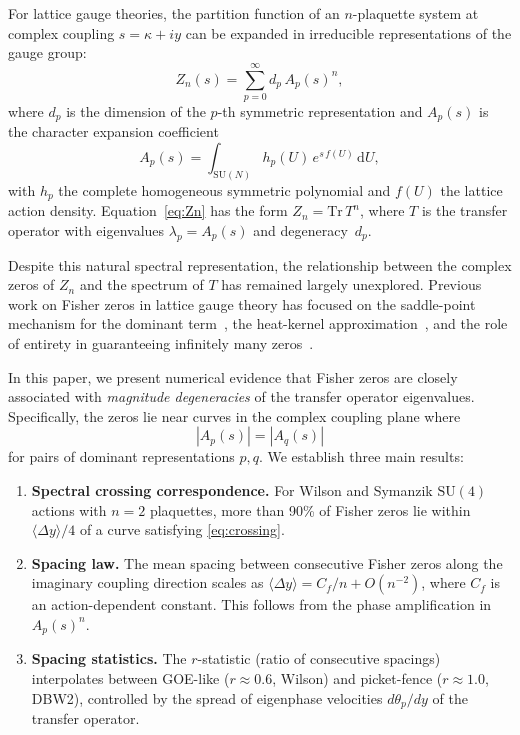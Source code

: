 \documentclass[12pt]{article}
\theoremstyle{definition}
\theoremstyle{remark}
\newcommand{\SU}{\mathrm{SU}}
\newcommand{\Tr}{\mathrm{Tr}}
\newcommand{\dU}{\,\mathrm{d}U}
\newcommand{\avg}[1]{\langle #1 \rangle}
\begin{document}
For lattice gauge theories, the partition function of an $n$-plaquette
system at complex coupling $s = \kappa + iy$ can be expanded in
irreducible representations of the gauge group:
\begin{equation}\label{eq:Zn}
Z_n(s) = \sum_{p=0}^{\infty} d_p\, A_p(s)^n,
\end{equation}
where $d_p$ is the dimension of the $p$-th symmetric representation
and $A_p(s)$ is the character expansion coefficient
\begin{equation}\label{eq:Ap}
A_p(s) = \int_{\SU(N)} h_p(U)\, e^{s\, f(U)}\dU,
\end{equation}
with $h_p$ the complete homogeneous symmetric polynomial and $f(U)$
the lattice action density.  Equation~\eqref{eq:Zn} has the
form $Z_n = \Tr\, T^n$, where $T$ is the transfer operator with
eigenvalues $\lambda_p = A_p(s)$ and degeneracy~$d_p$.

Despite this natural spectral representation, the relationship between
the complex zeros of $Z_n$ and the spectrum of $T$ has remained
largely unexplored.  Previous work on Fisher zeros in lattice gauge
theory has focused on the saddle-point mechanism for the dominant
term~\cite{OlbrykRho,OlbrykChi}, the heat-kernel
approximation~\cite{HeatKernel}, and the role of entirety in
guaranteeing infinitely many zeros~\cite{OlbrykChi}.

In this paper, we present numerical evidence that Fisher zeros are
closely associated with \emph{magnitude degeneracies} of the transfer
operator eigenvalues.  Specifically, the zeros lie near curves in the
complex coupling plane where
\begin{equation}\label{eq:crossing}
|A_p(s)| = |A_q(s)|
\end{equation}
for pairs of dominant representations $p, q$.  We establish three main
results:

\begin{enumerate}
\item \textbf{Spectral crossing correspondence.}  For Wilson and
  Symanzik $\SU(4)$ actions with $n = 2$ plaquettes, more than 90\%
  of Fisher zeros lie within $\avg{\Delta y}/4$ of a curve satisfying
  \eqref{eq:crossing}.

\item \textbf{Spacing law.}  The mean spacing between consecutive
  Fisher zeros along the imaginary coupling direction scales as
  $\avg{\Delta y} = C_f/n + O(n^{-2})$, where $C_f$ is an
  action-dependent constant.  This follows from the phase
  amplification in $A_p(s)^n$.

\item \textbf{Spacing statistics.}  The $r$-statistic (ratio of
  consecutive spacings) interpolates between GOE-like ($r \approx
  0.6$, Wilson) and picket-fence ($r \approx 1.0$, DBW2), controlled
  by the spread of eigenphase velocities $d\theta_p/dy$ of the
  transfer operator.
\end{enumerate}
\end{document}
